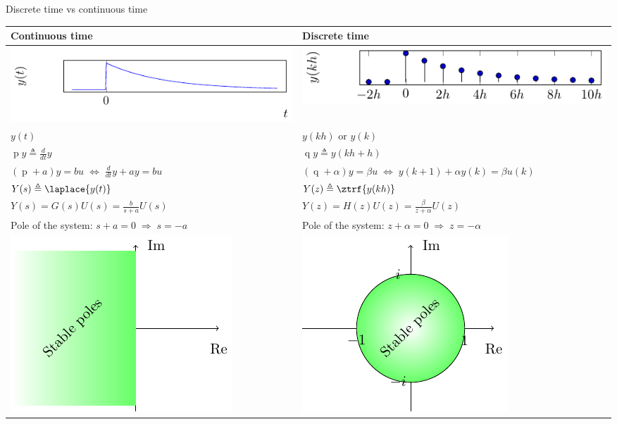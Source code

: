 \documentclass[presentation,aspectratio=169]{beamer}
\begin{document}
\begin{frame}[label={sec:org8f0d8ee}]{Discrete time vs continuous time}
\begin{center}
\begin{tabular}{ll}
Continuous time & Discrete time\\
\hline
\includegraphics[width=0.4\linewidth]{../../figures/cont-fcn} & \includegraphics[width=0.4\linewidth]{../../figures/discrete-fcn}\\
\(y(t)\) & \(y(kh)\) or \(y(k)\)\\
\(\operatorname{p} y \triangleq \frac{d}{dt} y\) & \(\operatorname{q}y \triangleq y(kh+h)\)\\
\((\operatorname{p}+a) y = bu \;\Leftrightarrow\; \frac{d}{dt}y + ay = bu\) & \((\operatorname{q} + \alpha) y = \beta u \; \Leftrightarrow \; y(k+1) + \alpha y(k) = \beta u(k)\)\\
\(Y(s) \triangleq \laplace{y(t)}\) & \(Y(z) \triangleq \ztrf{y(kh)}\)\\
\(Y(s) = G(s)U(s) = \frac{b}{s+a}U(s)\) & \(Y(z) = H(z)U(z) = \frac{\beta}{z+\alpha}U(z)\)\\
Pole of the system: \(s+a=0 \; \Rightarrow \; s = -a\) & Pole of the system: \(z+\alpha = 0 \; \Rightarrow \; z = -\alpha\)\\
\includegraphics[width=0.22\linewidth]{../../figures/cont-stable} & \includegraphics[width=0.22\linewidth]{../../figures/discrete-stable}\\
\hline
\end{tabular}
\end{center}
\end{frame}
\end{document}
